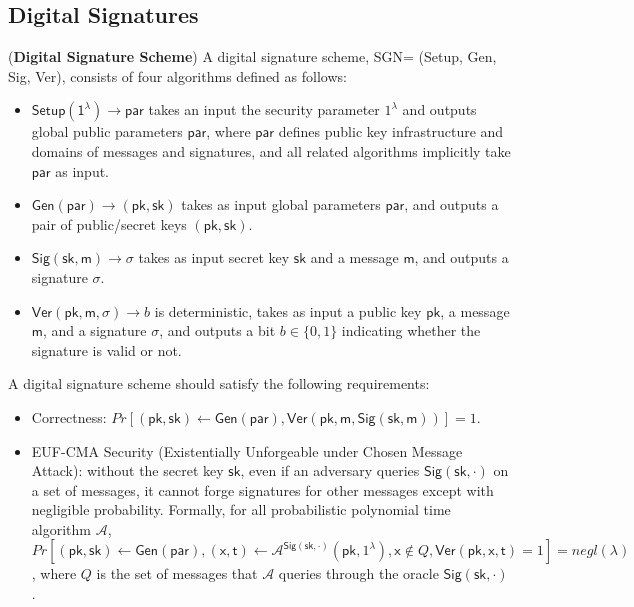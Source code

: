 \subsection{Digital Signatures}

\begin{definition}{(\textbf{Digital Signature Scheme})} A digital signature scheme, {\sffamily SGN= (Setup, Gen, Sig, Ver)}, consists of four algorithms defined as follows: 
\end{definition}
\begin{itemize}
    \item $\mathsf{Setup(1^\lambda) \to par}$ takes an input the security parameter $1^\lambda$ and outputs global public parameters $\mathsf{par}$, where $\mathsf{par}$ defines public key infrastructure and domains of messages and signatures, and all related algorithms implicitly take $\mathsf{par}$ as input.  
    \item $\mathsf{Gen(par)} \to (\mathsf{pk}, \mathsf{sk})$ takes as input global parameters $\mathsf{par}$, and outputs a pair of public/secret keys $(\mathsf{pk}, \mathsf{sk})$. 
    \item $\mathsf{Sig(sk, m)} \to \sigma$ takes as input secret key $\mathsf{sk}$ and a message $\mathsf{m}$, and outputs a signature $\sigma$. 
    \item $\mathsf{Ver}(\mathsf{pk}, \mathsf{m}, \sigma) \to b $ is deterministic, takes as input a public key $\mathsf{pk}$, a message $\mathsf{m}$, and a signature $\sigma$,  and outputs a bit $b\in\{0,1\}$ indicating whether the signature is valid or not. 
\end{itemize}

A digital signature scheme should satisfy the following requirements:
\begin{itemize}
    \item Correctness: $Pr[(\mathsf{pk}, \mathsf{sk})\leftarrow \mathsf{Gen(par)}, \mathsf{Ver(pk, m, Sig(sk, m))}]=1$. 
    \item EUF-CMA Security (Existentially Unforgeable under Chosen Message Attack): without the secret key $\mathsf{sk}$, even if an adversary queries $\mathsf{Sig(sk, \cdot)}$ on a set of messages, it cannot forge signatures for other messages except with negligible probability. Formally, for all probabilistic polynomial time algorithm $\mathcal{A}$, $Pr[(\mathsf{pk}, \mathsf{sk})\leftarrow \mathsf{Gen(par)}, (\mathsf{x},\mathsf{t})\leftarrow \mathcal{A}^{\mathsf{Sig(sk, \cdot)}}(\mathsf{pk}, 1^\lambda), \mathsf{x}\notin Q, \mathsf{Ver(pk, x, t)}=1] = negl(\lambda)$, where $Q$ is the set of messages that $\mathcal{A}$ queries through the oracle $\mathsf{Sig(sk, \cdot)}$. 
    
\end{itemize}

